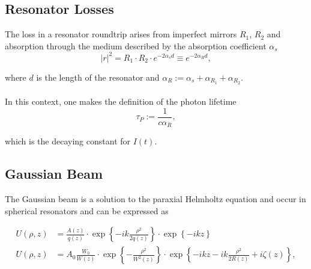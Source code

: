 \documentclass{article}
\newcommand{\lrschweif}[1]{\left\{#1\right\}}
\begin{document}
\newpage


\subsection{Resonator Losses}
The loss in a resonator roundtrip arises from imperfect mirrors $R_1$, $R_2$ and absorption through the medium described by the absorption coefficient $\alpha_s$
	\begin{equation}
		|r|^2 = R_1 \cdot R_2 \cdot e^{-2\alpha_s d} \equiv e^{-2\alpha_R d},
	\end{equation}

where $d$ is the length of the resonator and $\alpha_R := \alpha_s + \alpha_{R_1} + \alpha_{R_2}$.\\
\\
In this context, one makes the definition of the photon lifetime
	\begin{equation}
		\tau_P := \frac{1}{c\alpha_R},
	\end{equation}

which is the decaying constant for $I(t)$.






\newpage


\subsection{Gaussian Beam}
The Gaussian beam is a solution to the paraxial Helmholtz equation and occur in spherical resonators and can be expressed as

	\begin{align}
		U(\rho,z) &= \frac{A(z)}{q(z)} \cdot \exp \lrschweif{ -ik \frac{\rho^2}{2q(z)} } \cdot \exp\lrschweif{ -ikz } \\
		U(\rho,z) &= A_0 \frac{W_0}{W(z)} \cdot \exp \lrschweif{ -\frac{\rho^2}{W^2(z)} } \cdot \exp \lrschweif{ -ikz - ik\frac{\rho^2}{2R(z)} + i\zeta(z) },
	\end{align}
	
\end{document}
